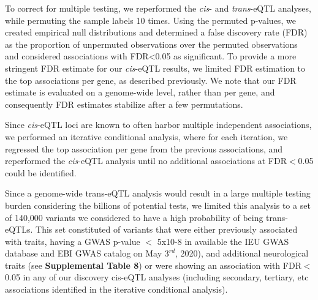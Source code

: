 To correct for multiple testing, we reperformed the \emph{cis}- and \emph{trans}-eQTL analyses, while permuting the sample labels 10 times. Using the permuted p-values, we created empirical null distributions and determined a false discovery rate (FDR) as the proportion of unpermuted observations over the permuted observations and considered associations with FDR<0.05 as significant. To provide a more stringent FDR estimate for our \emph{cis}-eQTL results, we limited FDR estimation to the top associations per gene, as described previously\cite{vosaUnravelingPolygenicArchitecture2018}. We note that our FDR estimate is evaluated on a genome-wide level, rather than per gene, and consequently FDR estimates stabilize after a few permutations\cite{westraSystematicIdentificationTrans2013}. 

Since \emph{cis}-eQTL loci are known to often harbor multiple independent associations, we performed an iterative conditional analysis, where for each iteration, we regressed the top association per gene from the previous associations, and reperformed the \emph{cis}-eQTL analysis until no additional associations at FDR$<$0.05 could be identified. 

Since a genome-wide trans-eQTL analysis would result in a large multiple testing burden considering the billions of potential tests, we limited this analysis to a set of 140,000 variants we considered to have a high probability of being trans-eQTLs. This set constituted of variants that were either previously associated with traits, having a GWAS p-value $<$ 5x10-8 in available the IEU GWAS database\cite{lyonVariantCallFormat2020} and EBI GWAS catalog\cite{bunielloNHGRIEBIGWASCatalog2019} on May $3^{rd}$, 2020), and additional neurological traits (see \textbf{Supplemental Table 8}) or were showing an association with FDR$<$0.05 in any of our discovery cis-eQTL analyses (including secondary, tertiary, etc associations identified in the iterative conditional analysis). 

